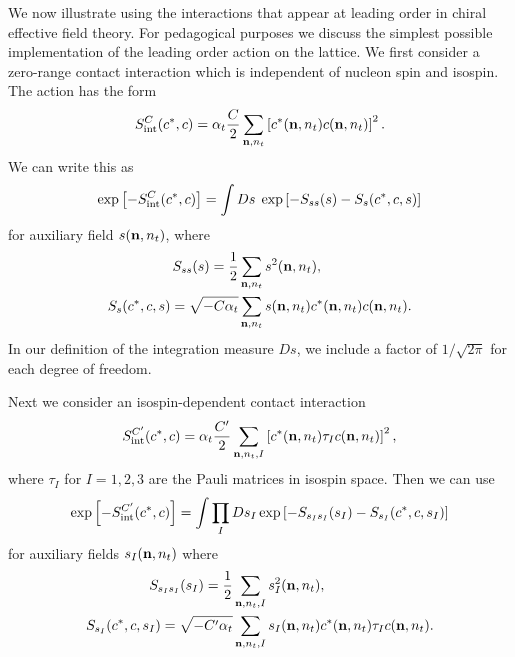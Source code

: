We now illustrate using the interactions that appear at leading order in
chiral effective field theory.  For pedagogical purposes we discuss the simplest possible implementation of the leading order action on the lattice.  We first consider a zero-range contact interaction
which is independent of
nucleon spin and isospin.
The action has the form 
\begin{equation}
S^{C}_\text{int}(c^{\ast},c) = \alpha_{t}\frac{C}{2} \sum_{{\bf n},n_t} \left[c^{\ast}({\bf
n},n_t)c({\bf n},n_t)\right]^2.
\end{equation}
We can write this as
\begin{equation}
\exp\left[-S^C_{\rm int}(c^*,c)\right] = \int Ds \; \exp\left[-S_{ss}(s)
- S_{s}(c^*,c,s)\right]
\label{aux}
\end{equation}
for auxiliary field $s({\bf n},n_t)$, 
where
\begin{align}
S_{ss}(s) = \frac{1}{2} & \sum_{{\bf n},n_t} s^{2}({\bf n},n_t),
 \\
S_{s}(c^*,c,s) =  \sqrt{-C\alpha_{t}} & \sum_{{\bf n},n_t} s({\bf n},n_t)c^{\ast}({\bf
n},n_t)c({\bf n},n_t).  
\end{align}
In our definition of the integration measure $Ds$, we include a factor of
$1/\sqrt{2\pi}$ for each degree of freedom.

Next we consider an isospin-dependent contact interaction 
\begin{equation}
S^{C'}_\text{int}(c^{\ast},c) = \alpha_{t}\frac{C'}{2} \sum_{{\bf n},n_t,I}
\left[c^{\ast}({\bf
n},n_t)\tau_I c({\bf n},n_t)\right]^2,
\end{equation}
where $\tau_I$ for $I=1,2,3$ are the Pauli matrices in isospin space.  Then
we can use
\begin{equation}
\exp\left[-S^{C'}_{\rm int}(c^*,c)\right] = \int \prod_I Ds_I \exp\left[-S_{s_Is_I}(s_I)
- S_{s_I}(c^*,c,s_{I})\right]
\label{aux2}
\end{equation}
for auxiliary fields $s_I({\bf n},n_t)$ where
\begin{align}
S_{s_Is_I}(s_I)=\frac{1}{2} & \sum_{{\bf n},n_t,I} s_I^{2}({\bf n},n_t),
\\
S_{s_I}(c^*,c,s_{I}) = \sqrt{-C'\alpha_{t}} & \sum_{{\bf n},n_t,I} s_{I}({\bf
n},n_t)c^{\ast}({\bf
n},n_t)\tau_Ic({\bf n},n_t).  
\end{align}

